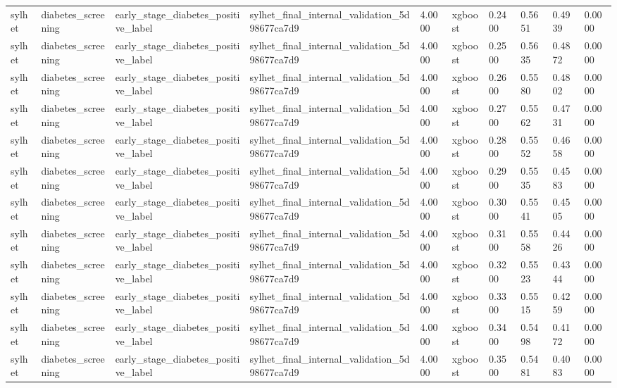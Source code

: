 \begin{tabular}{llllllllll}
sylhet & diabetes\_screening & early\_stage\_diabetes\_positive\_label & sylhet\_final\_internal\_validation\_5d98677ca7d9 & 4.0000 & xgboost & 0.2400 & 0.5651 & 0.4939 & 0.0000 \\
sylhet & diabetes\_screening & early\_stage\_diabetes\_positive\_label & sylhet\_final\_internal\_validation\_5d98677ca7d9 & 4.0000 & xgboost & 0.2500 & 0.5635 & 0.4872 & 0.0000 \\
sylhet & diabetes\_screening & early\_stage\_diabetes\_positive\_label & sylhet\_final\_internal\_validation\_5d98677ca7d9 & 4.0000 & xgboost & 0.2600 & 0.5580 & 0.4802 & 0.0000 \\
sylhet & diabetes\_screening & early\_stage\_diabetes\_positive\_label & sylhet\_final\_internal\_validation\_5d98677ca7d9 & 4.0000 & xgboost & 0.2700 & 0.5562 & 0.4731 & 0.0000 \\
sylhet & diabetes\_screening & early\_stage\_diabetes\_positive\_label & sylhet\_final\_internal\_validation\_5d98677ca7d9 & 4.0000 & xgboost & 0.2800 & 0.5552 & 0.4658 & 0.0000 \\
sylhet & diabetes\_screening & early\_stage\_diabetes\_positive\_label & sylhet\_final\_internal\_validation\_5d98677ca7d9 & 4.0000 & xgboost & 0.2900 & 0.5535 & 0.4583 & 0.0000 \\
sylhet & diabetes\_screening & early\_stage\_diabetes\_positive\_label & sylhet\_final\_internal\_validation\_5d98677ca7d9 & 4.0000 & xgboost & 0.3000 & 0.5541 & 0.4505 & 0.0000 \\
sylhet & diabetes\_screening & early\_stage\_diabetes\_positive\_label & sylhet\_final\_internal\_validation\_5d98677ca7d9 & 4.0000 & xgboost & 0.3100 & 0.5558 & 0.4426 & 0.0000 \\
sylhet & diabetes\_screening & early\_stage\_diabetes\_positive\_label & sylhet\_final\_internal\_validation\_5d98677ca7d9 & 4.0000 & xgboost & 0.3200 & 0.5523 & 0.4344 & 0.0000 \\
sylhet & diabetes\_screening & early\_stage\_diabetes\_positive\_label & sylhet\_final\_internal\_validation\_5d98677ca7d9 & 4.0000 & xgboost & 0.3300 & 0.5515 & 0.4259 & 0.0000 \\
sylhet & diabetes\_screening & early\_stage\_diabetes\_positive\_label & sylhet\_final\_internal\_validation\_5d98677ca7d9 & 4.0000 & xgboost & 0.3400 & 0.5498 & 0.4172 & 0.0000 \\
sylhet & diabetes\_screening & early\_stage\_diabetes\_positive\_label & sylhet\_final\_internal\_validation\_5d98677ca7d9 & 4.0000 & xgboost & 0.3500 & 0.5481 & 0.4083 & 0.0000 \\

\end{tabular}
